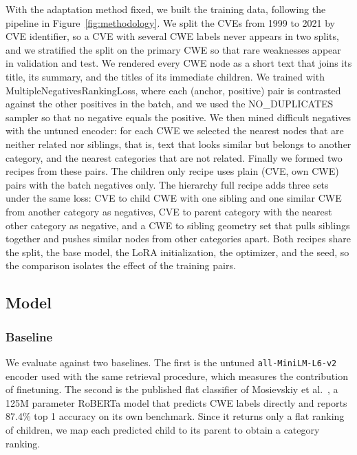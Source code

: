 \documentclass[conference,compsoc]{IEEEtran}
\begin{document}
With the adaptation method fixed, we built the training data, following the pipeline in Figure~\ref{fig:methodology}. We split the CVEs from 1999 to 2021 by CVE identifier, so a CVE with several CWE labels never appears in two splits, and we stratified the split on the primary CWE so that rare weaknesses appear in validation and test. We rendered every CWE node as a short text that joins its title, its summary, and the titles of its immediate children. We trained with MultipleNegativesRankingLoss, where each (anchor, positive) pair is contrasted against the other positives in the batch, and we used the NO\_DUPLICATES sampler so that no negative equals the positive. We then mined difficult negatives with the untuned encoder: for each CWE we selected the nearest nodes that are neither related nor siblings, that is, text that looks similar but belongs to another category, and the nearest categories that are not related. Finally we formed two recipes from these pairs. The children only recipe uses plain (CVE, own CWE) pairs with the batch negatives only. The hierarchy full recipe adds three sets under the same loss: CVE to child CWE with one sibling and one similar CWE from another category as negatives, CVE to parent category with the nearest other category as negative, and a CWE to sibling geometry set that pulls siblings together and pushes similar nodes from other categories apart. Both recipes share the split, the base model, the LoRA initialization, the optimizer, and the seed, so the comparison isolates the effect of the training pairs.


\subsection{Model}

\subsubsection{Baseline}

We evaluate against two baselines. The first is the untuned \texttt{all-MiniLM-L6-v2} encoder used with the same retrieval procedure, which measures the contribution of finetuning. The second is the published flat classifier of Mosievskiy et al.~\cite{mosievskiy2026roberta}, a 125M parameter RoBERTa model that predicts CWE labels directly and reports 87.4\% top 1 accuracy on its own benchmark. Since it returns only a flat ranking of children, we map each predicted child to its parent to obtain a category ranking.
\end{document}
